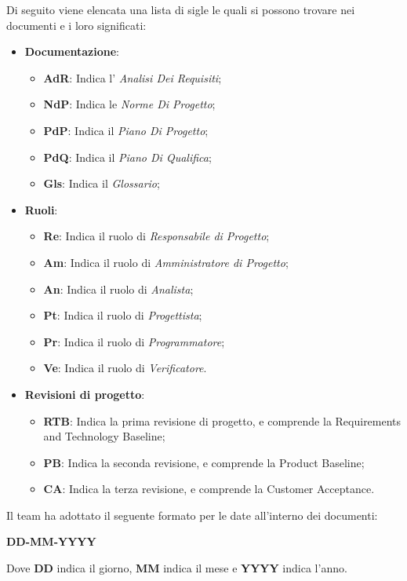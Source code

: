 Di seguito viene elencata una lista di sigle le quali si possono trovare nei documenti e i loro significati:
\begin {itemize}
\item \textbf{Documentazione}:
	\begin {itemize}
	\item \textbf{AdR}: Indica l' \textit{Analisi Dei Requisiti};
	\item \textbf{NdP}: Indica le \textit{Norme Di Progetto};
	\item \textbf{PdP}: Indica il \textit{Piano Di Progetto};
	\item \textbf{PdQ}: Indica il \textit{Piano Di Qualifica};
	\item \textbf{Gls}: Indica il \textit{Glossario};
	\end {itemize}
\item \textbf{Ruoli}:
	\begin {itemize}
	\item \textbf{Re}: Indica il ruolo di \textit{Responsabile di Progetto};
	\item \textbf{Am}: Indica il ruolo di \textit{Amministratore di Progetto};
	\item \textbf{An}: Indica il ruolo di \textit{Analista};
	\item \textbf{Pt}: Indica il ruolo di \textit{Progettista};
	\item \textbf{Pr}: Indica il ruolo di \textit{Programmatore};
	\item \textbf{Ve}: Indica il ruolo di \textit{Verificatore}.
	\end {itemize}
\item \textbf{Revisioni di progetto}:
	\begin{itemize}
		\item \textbf{RTB}: Indica la prima revisione di progetto, e comprende la Requirements and Technology Baseline;
		\item \textbf{PB}: Indica la seconda revisione, e comprende la Product Baseline;
		\item \textbf{CA}: Indica la terza revisione, e comprende la Customer Acceptance.
	\end{itemize}
\end {itemize}
Il team ha adottato il seguente formato per le date all'interno dei documenti:
\begin{center}
    \large{\textbf{DD-MM-YYYY}}
\end{center}
Dove \textbf{DD} indica il giorno, \textbf{MM} indica il mese e \textbf{YYYY} indica l'anno.

